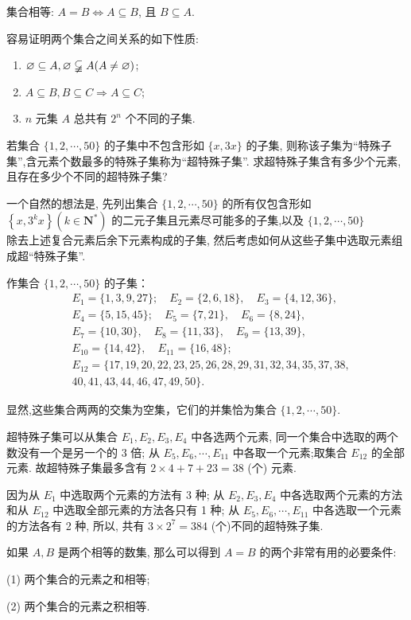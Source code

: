 集合相等: $A=B \Leftrightarrow A \subseteq B$, 且 $B \subseteq A$.

容易证明两个集合之间关系的如下性质:

\begin{enumerate}
  \item $\varnothing \subseteq A, \varnothing \varsubsetneqq A(A \neq \varnothing)$;
  \item $A \subseteq B, B \subseteq C \Rightarrow A \subseteq C$;
  \item $n$ 元集 $A$ 总共有 $2^{n}$ 个不同的子集.
\end{enumerate}
\begin{example}
若集合 $\{1,2, \cdots, 50\}$ 的子集中不包含形如 $\{x, 3 x\}$ 的子集, 则称该子集为“特殊子集”,含元素个数最多的特殊子集称为“超特殊子集”. 求超特殊子集含有多少个元素,且存在多少个不同的超特殊子集?
\end{example}

\begin{analysis}
一个自然的想法是, 先列出集合 $\{1,2, \cdots, 50\}$ 的所有仅包含形如 $\left\{x, 3^{k} x\right\}\left(k \in \mathbf{N}^{*}\right)$ 的二元子集且元素尽可能多的子集,以及 $\{1,2, \cdots, 50\}$\\
除去上述复合元素后余下元素构成的子集, 然后考虑如何从这些子集中选取元素组成超“特殊子集”.
\end{analysis}
\begin{solution}
作集合 $\{1,2, \cdots, 50\}$ 的子集：
$$
\begin{aligned}
& E_{1}=\{1,3,9,27\} ; \quad E_{2}=\{2,6,18\}, \quad E_{3}=\{4,12,36\}, \\
& E_{4}=\{5,15,45\} ; \quad E_{5}=\{7,21\}, \quad E_{6}=\{8,24\}, \\
& E_{7}=\{10,30\}, \quad E_{8}=\{11,33\}, \quad E_{9}=\{13,39\}, \\
& E_{10}=\{14,42\}, \quad E_{11}=\{16,48\} ; \\
& E_{12}=\{17,19,20,22,23,25,26,28,29,31,32,34,35,37,38, \\
&40,41,43,44,46,47,49,50\} .
\end{aligned}
$$

显然,这些集合两两的交集为空集，它们的并集恰为集合 $\{1,2, \cdots, 50\}$.

超特殊子集可以从集合 $E_{1} ,  E_{2} ,  E_{3} ,  E_{4}$ 中各选两个元素, 同一个集合中选取的两个数没有一个是另一个的 3 倍; 从 $E_{5}, E_{6}, \cdots, E_{11}$ 中各取一个元素;取集合 $E_{12}$ 的全部元素. 故超特殊子集最多含有 $2 \times 4+7+23=38$ (个) 元素.

因为从 $E_{1}$ 中选取两个元素的方法有 3 种; 从 $E_{2} ,  E_{3} ,  E_{4}$ 中各选取两个元素的方法和从 $E_{12}$ 中选取全部元素的方法各只有 1 种; 从 $E_{5}, E_{6}, \cdots, E_{11}$ 中各选取一个元素的方法各有 2 种, 所以, 共有 $3 \times 2^{7}=384$ (个)不同的超特殊子集.

如果 $A ,  B$ 是两个相等的数集, 那么可以得到 $A=B$ 的两个非常有用的必要条件:

(1) 两个集合的元素之和相等;

(2) 两个集合的元素之积相等.
\end{solution}

